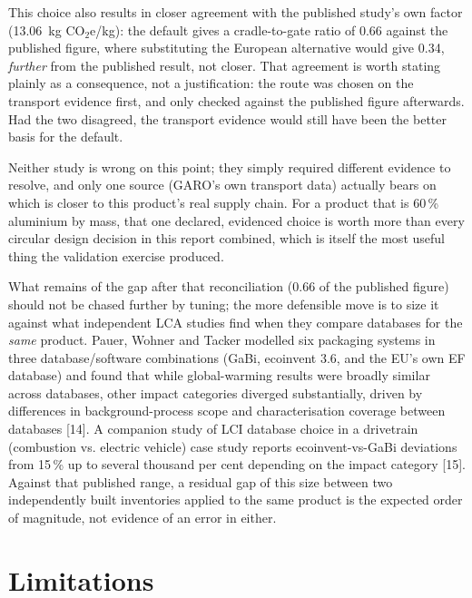 \documentclass[11pt,a4paper]{article}
\begin{document}
This choice also results in closer agreement with the published study's own
factor (\SI{13.06}{\kilo\gram} CO$_2$e/kg): the default gives a
cradle-to-gate ratio of 0.66 against the published figure, where
substituting the European alternative would give 0.34, \emph{further}
from the published result, not closer. That agreement is worth stating plainly
as a consequence, not a justification: the route was chosen on the transport
evidence first, and only checked against the published figure afterwards. Had
the two disagreed, the transport evidence would still have been the better
basis for the default.

Neither study is wrong on this point; they simply required different evidence
to resolve, and only one source (GARO's own transport data) actually bears on
which is closer to this product's real supply chain. For a product that is
60\,\% aluminium by mass, that one declared, evidenced choice is
worth more than every circular design decision in this report combined,
which is itself the most useful thing the validation exercise produced.

What remains of the gap after that reconciliation (0.66 of the
published figure) should not be chased further by tuning; the more defensible
move is to size it against what independent LCA studies find when they compare
databases for the \emph{same} product. Pauer, Wohner and Tacker modelled six
packaging systems in three database/software combinations (GaBi, ecoinvent
3.6, and the EU's own EF database) and found that while global-warming results
were broadly similar across databases, other impact categories diverged
substantially, driven by differences in background-process scope and
characterisation coverage between databases [14]. A companion
study of LCI database choice in a drivetrain (combustion vs. electric vehicle)
case study reports ecoinvent-vs-GaBi deviations from 15\,\% up to several
thousand per cent depending on the impact category [15].
Against that published range, a residual gap of
this size between two independently built inventories applied to the same
product is the expected order of magnitude, not evidence of an error in
either.

\section{Limitations}
\end{document}
